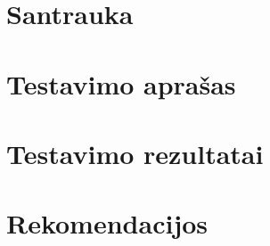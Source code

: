   

  \section{Santrauka}
  

  \newpage
  \section{Testavimo aprašas}
  

  \newpage
  \section{Testavimo rezultatai}
  

  \newpage
  \section{Rekomendacijos}
  

